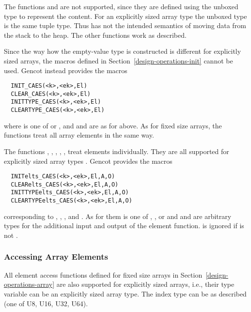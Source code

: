 The functions  and  are not supported, since they are defined using the unboxed type 
to represent the content. For an explicitly sized array type the unboxed type is the same tuple type. Thus  has not the
intended semantics of moving data from the stack to the heap. The other functions work as described.

Since the way how the empty-value type is constructed is different for explicitly sized arrays, the macros defined in
Section~\ref{design-operations-init} cannot be used. Gencot instead provides the macros
\begin{verbatim}
  INIT_CAES(<k>,<ek>,El)
  CLEAR_CAES(<k>,<ek>,El)
  INITTYPE_CAES(<k>,<ek>,El)
  CLEARTYPE_CAES(<k>,<ek>,El)
\end{verbatim}
where  is one of  or , and  and  are as for  above. As for fixed size
arrays, the functions treat all array elements in the same way.

The functions , , , , , 
 treat elements individually. They are all supported for explicitly sized array types . 
Gencot provides the macros
\begin{verbatim}
  INITelts_CAES(<k>,<ek>,El,A,O)
  CLEARelts_CAES(<k>,<ek>,El,A,O)
  INITTYPEelts_CAES(<k>,<ek>,El,A,O)
  CLEARTYPEelts_CAES(<k>,<ek>,El,A,O)
\end{verbatim}
corresponding to , , , and . As for them
 is one of , , or  and  and  are arbitrary types for the 
additional input and output of the element function.  is ignored if  is not .

\subsubsection{Accessing Array Elements}

All element access functions defined for fixed size arrays in Section~\ref{design-operations-array} are also supported for 
explicitly sized arrays, i.e., their type variable  can be an explicitly sized array type. The index type 
can be as described (one of U8, U16, U32, U64).
